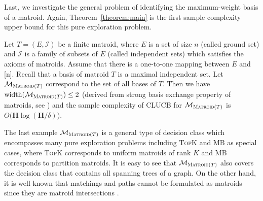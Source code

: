 \documentclass{article}
\newcommand{\Algorithm}{{\small \textsf{CLUCB}}\xspace}
\newcommand{\M}{\mathcal M}
\newcommand{\del}{\backslash}
\DeclareMathOperator{\rank}{width}
\newcommand{\MultiIdent}{\textsc{TopK}\xspace}
\newcommand{\MultiBandit}{\textsc{MB}\xspace}
\newcommand{\Matroid}{\textsc{Matroid}\xspace}
\begin{document}
Last, we investigate the general problem of identifying the maximum-weight basis of a matroid.
Again, Theorem~\ref{theorem:main} is the first sample complexity upper bound for this pure exploration problem.
\begin{example}[Matroids]
\label{example:matroid}
Let $T=(E,\mathcal I)$ be a finite matroid, where $E$ is a set of size $n$ (called ground set) and $\mathcal I$ is a family of subsets of $E$ (called independent sets) which satisfies the axioms of matroids.
Assume that there is a one-to-one mapping between $E$ and [n].
Recall that a basis of matroid $T$ is a maximal independent set.
Let $\M_{\Matroid(T)}$ correspond to the set of all bases of $T$.
Then we have $\rank(\M_{\Matroid(T)}) \le 2$ (derived from strong basis exchange property of matroids, see ) and the sample complexity of \Algorithm for $\M_{\Matroid(T)}$ is $O\big(\mathbf H \log(\mathbf H/\delta)\big)$.
\end{example}
The last example $\M_{\Matroid(T)}$ is a general type of decision class which encompasses many pure exploration problems including \MultiIdent and \MultiBandit as special cases, where \MultiIdent corresponds to uniform matroids of rank $K$ and \MultiBandit corresponds to partition matroids.
It is easy to see that $\M_{\Matroid(T)}$ also covers the decision class that contains all spanning trees of a graph.
On the other hand, it is well-known that matchings and paths cannot be formulated as matroids since they are matroid intersections \citep{oxley2006matroid}.
\end{document}
